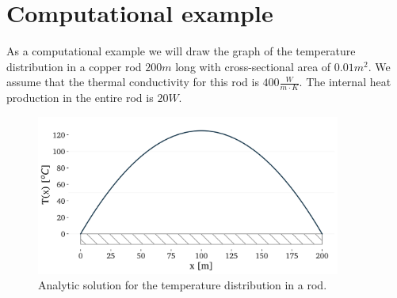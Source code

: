 \documentclass[10pt]{article}
\begin{document}
\section*{Computational example}

As a computational example we will draw the graph of the temperature distribution in a copper rod $200m$ long with cross-sectional area of $0.01m^2$. We assume that the thermal conductivity for this rod is $400 \frac{W}{m \cdot K}$. The internal heat production in the entire rod is $20 W$.

\begin{figure}[H]
\centering\includegraphics[width=10cm]{plots/example-heat-transfer-in-a-rod-analytic.png}
\caption{Analytic solution for the temperature distribution in a rod.}
\label{fig:analytic-solution}
\end{figure}
\end{document}

